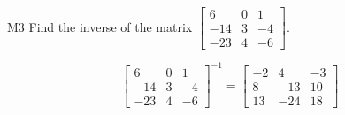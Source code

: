 \documentclass{sbgLAquiz}
\begin{document}
\begin{extract}\newpage\end{extract}
\begin{problem}{M3} Find the inverse of the matrix $\begin{bmatrix} 6 & 0 & 1 \\ -14 & 3 & -4 \\ -23 & 4 & -6\end{bmatrix}$.
\end{problem}
\begin{solution}
$$\begin{bmatrix} 6 & 0 & 1 \\ -14 & 3 & -4 \\ -23 & 4 & -6\end{bmatrix}^{-1} = \begin{bmatrix} -2 & 4 & -3 \\ 8 & -13 & 10 \\ 13 & -24 & 18 \end{bmatrix}$$
\end{solution}
\end{document}
